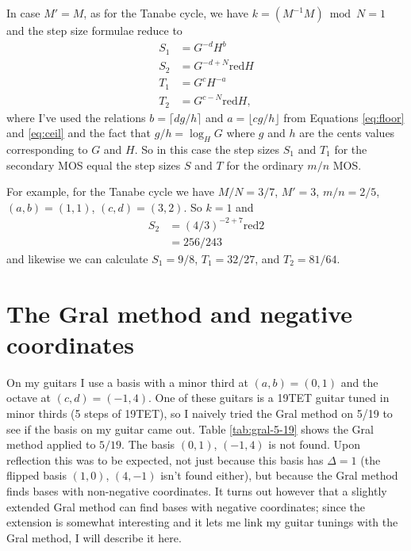 \documentclass[a4paper,11pt]{article}
\newcommand\red{\mathbin{\mathrm{red}}}
\begin{document}
In case $M' = M$, as for the Tanabe cycle, we have $k = (M^{-1} M) \bmod N = 1$
and the step size formulae reduce to
\begin{align}
    S_1 &=  G^{-d} H^{b} \\
    S_2 &=  G^{-d + N} \red H \\
    T_1 &=  G^{c} H^{-a} \\
    T_2 &=  G^{c - N} \red H,
\end{align}
where I've used the relations $b = \lceil d g/h \rceil$ and $a = \lfloor c g/h
\rfloor$ from Equations \ref{eq:floor} and \ref{eq:ceil} and the fact that $g/h
= \log_H G$ where $g$ and $h$ are the cents values corresponding to $G$ and
$H$. So in this case the step sizes $S_1$ and $T_1$ for the secondary MOS equal
the step sizes $S$ and $T$ for the ordinary $m/n$ MOS.

For example, for the Tanabe cycle we have $M/N = 3/7$, $M' = 3$, $m/n = 2/5$,
$(a, b) = (1, 1)$, $(c, d) = (3, 2)$. So $k = 1$ and
\begin{align}
    S_2 &=  (4/3)^{-2 + 7} \red 2   \\
        &=  256/243
\end{align}
and likewise we can calculate $S_1 = 9/8$, $T_1 = 32/27$, and $T_2 = 81/64$.

\section{The Gral method and negative coordinates}
\label{app:extended-gral}
On my guitars I use a basis with a minor third at $(a, b) = (0, 1)$ and the
octave at $(c, d) = (-1, 4)$. One of these guitars is a 19TET guitar tuned in
minor thirds (5 steps of 19TET), so I naively tried the Gral method on 5/19 to
see if the basis on my guitar came out. Table \ref{tab:gral-5-19} shows the
Gral method applied to $5/19$. The basis $(0, 1)$, $(-1, 4)$ is not found. Upon
reflection this was to be expected, not just because this basis has $\Delta =
1$ (the flipped basis $(1, 0)$, $(4, -1)$ isn't found either), but because the
Gral method finds bases with non-negative coordinates. It turns out however
that a slightly extended Gral method can find bases with negative coordinates;
since the extension is somewhat interesting and it lets me link my guitar
tunings with the Gral method, I will describe it here.
\end{document}
